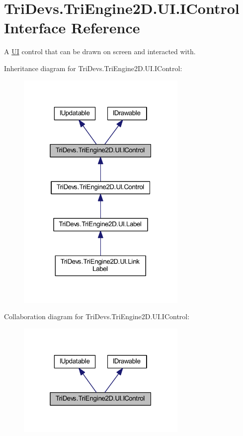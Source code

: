 \hypertarget{interface_tri_devs_1_1_tri_engine2_d_1_1_u_i_1_1_i_control}{\section{Tri\-Devs.\-Tri\-Engine2\-D.\-U\-I.\-I\-Control Interface Reference}
\label{interface_tri_devs_1_1_tri_engine2_d_1_1_u_i_1_1_i_control}
}


A \hyperlink{namespace_tri_devs_1_1_tri_engine2_d_1_1_u_i}{U\-I} control that can be drawn on screen and interacted with.  




Inheritance diagram for Tri\-Devs.\-Tri\-Engine2\-D.\-U\-I.\-I\-Control\-:\nopagebreak
\begin{figure}[H]
\begin{center}
\leavevmode
\includegraphics[width=232pt]{interface_tri_devs_1_1_tri_engine2_d_1_1_u_i_1_1_i_control__inherit__graph}
\end{center}
\end{figure}


Collaboration diagram for Tri\-Devs.\-Tri\-Engine2\-D.\-U\-I.\-I\-Control\-:\nopagebreak
\begin{figure}[H]
\begin{center}
\leavevmode
\includegraphics[width=232pt]{interface_tri_devs_1_1_tri_engine2_d_1_1_u_i_1_1_i_control__coll__graph}
\end{center}
\end{figure}
